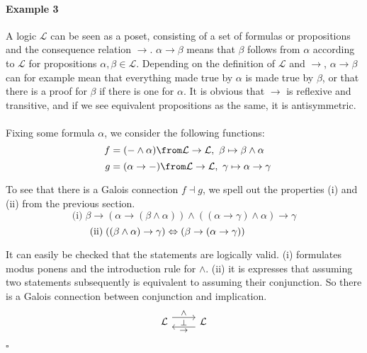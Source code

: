 \paragraph{Example 3}
	 A logic $\mathcal{L}$ can be seen as a poset, consisting of a set of formulas or propositions and the consequence relation $\rightarrow$. $\alpha \rightarrow \beta$ means that $\beta$ follows from $\alpha$ according to $\mathcal{L}$  for propositions $\alpha, \beta \in \mathcal{L}$. Depending on the definition of $\mathcal L$ and $\rightarrow$, $\alpha \rightarrow \beta$ can for example mean that everything made true by $\alpha$ is made true by $\beta$, or that there is a proof for $\beta$ if there is one for $\alpha$. It is obvious that $\to$ is reflexive and transitive, and if we see equivalent propositions as the same, it is antisymmetric.
	\\\\Fixing some formula $\alpha$, we consider the following functions:
	\[f = (- \land \alpha) \from \mathcal{L} \to \mathcal{L}, \,\, \beta \mapsto \beta \land \alpha\]
	\[\;\;\;g = (\alpha \rightarrow - ) \from \mathcal{L} \to \mathcal{L}, \,\, \gamma \mapsto   \alpha \rightarrow \gamma\\\]

	To see that there is a Galois connection $f \dashv g$, we spell out the properties (i) and (ii) from the previous section.\\
	\[\text{(i)}\;\beta \rightarrow (\alpha \rightarrow (\beta \land \alpha)) \land ((\alpha \rightarrow \gamma) \land \alpha) \rightarrow \gamma\]
	\[\text{(ii)}\;((\beta \land \alpha) \rightarrow \gamma) \Leftrightarrow (\beta \rightarrow (\alpha \rightarrow \gamma))\;\;\;\;\;\;\;\;\;\;\;\;\;\\\]


	It can easily be checked that the statements are logically valid. (i) formulates modus ponens and the introduction rule for $\land$. (ii) it is expresses that assuming two statements subsequently is equivalent to assuming their conjunction. So there is a Galois connection between conjunction and implication.  \\
		\[\begin{tikzcd}	
	[ampersand replacement=\&, every label/.append style = {font = \footnotesize}]
	\mathcal{L} \arrow[r, shift left=2,"\land","\bot"']
	\& \mathcal{L} \arrow[l, shift left=2, "\rightarrow"]
	\end{tikzcd}\]{\begin{flushright}$\square$\end{flushright}}
